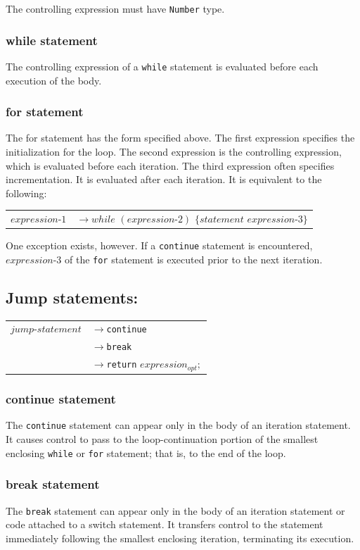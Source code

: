 \documentclass[12pt,A4]{book}
\begin{document}
The controlling expression must have \verb|Number| type.
\subsubsection{while statement}
The controlling expression of a \verb|while| statement is evaluated before each execution of the body.
\subsubsection{for statement}
The for statement has the form specified above.  The first expression specifies the initialization for the loop.  The second expression is the controlling expression, which is evaluated before each iteration.  The third expression often specifies incrementation.  It is evaluated after each iteration. It is equivalent to the following:

\begin{tabular}{l l}
$expression\mbox{-}1$  & $\rightarrow while$ $(expression\mbox{-}2)$ $\{statement$ $expression\mbox{-}3\}$\\
\end{tabular}

One exception exists, however.  If a \verb|continue| statement is encountered, $expression\mbox{-}3$ of the \verb|for| statement is executed prior to the next iteration.
\subsection{Jump statements:}

\begin{tabular}{l l}
$jump\mbox{-}statement$ & $\rightarrow$\verb|continue|\\
                & $\rightarrow$\verb|break|\\
                & $\rightarrow$\verb|return| $expression_{opt};$
\end{tabular}

\subsubsection{continue statement}
The \verb|continue| statement can appear only in the body of an iteration statement.  It causes control to pass to the loop-continuation portion of the smallest enclosing \verb|while| or \verb|for| statement; that is, to the end of the loop.
\subsubsection{break statement}
The \verb|break| statement can appear only in the body of an iteration statement or code attached to a switch statement. It transfers control to the statement immediately following the smallest enclosing iteration, terminating its execution.
\end{document}
